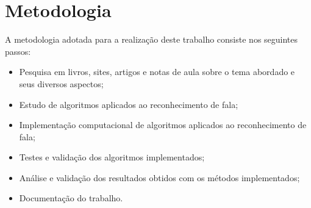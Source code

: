 \section{Metodologia}

\quad A metodologia adotada para a realização deste trabalho consiste nos seguintes passos:

\begin{itemize}
\item Pesquisa em livros, sites, artigos e notas de aula sobre o tema abordado e seus diversos aspectos;
\item Estudo de algoritmos aplicados ao reconhecimento de fala;
\item Implementação computacional de algoritmos aplicados ao reconhecimento de fala;
\item Testes e validação dos algoritmos implementados;
\item Análise e validação dos resultados obtidos com os métodos implementados;
\item Documentação do trabalho. 

\end{itemize}


























